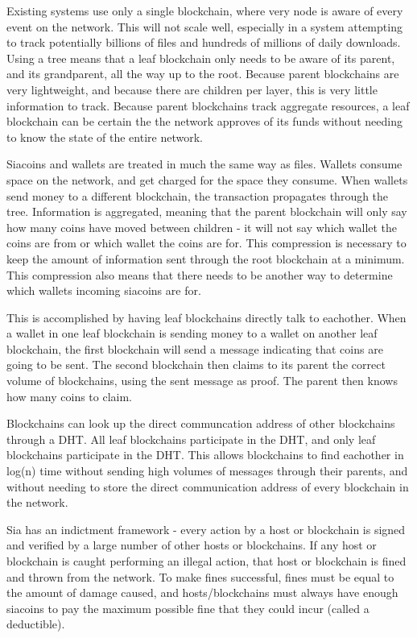 \documentclass[twocolumn]{article}
\begin{document}
Existing systems use only a single blockchain, where very node is aware of every event on the network.
This will not scale well, especially in a system attempting to track potentially billions of files and hundreds of millions of daily downloads.
Using a tree means that a leaf blockchain only needs to be aware of its parent, and its grandparent, all the way up to the root.
Because parent blockchains are very lightweight, and because there are \childrenperparent \space children per layer, this is very little information to track.
Because parent blockchains track aggregate resources, a leaf blockchain can be certain the the network approves of its funds without needing to know the state of the entire network.

Siacoins and wallets are treated in much the same way as files.
Wallets consume space on the network, and get charged for the space they consume.
When wallets send money to a different blockchain, the transaction propagates through the tree.
Information is aggregated, meaning that the parent blockchain will only say how many coins have moved between children - it will not say which wallet the coins are from or which wallet the coins are for.
This compression is necessary to keep the amount of information sent through the root blockchain at a minimum.
This compression also means that there needs to be another way to determine which wallets incoming siacoins are for.

This is accomplished by having leaf blockchains directly talk to eachother.
When a wallet in one leaf blockchain is sending money to a wallet on another leaf blockchain, the first blockchain will send a message indicating that coins are going to be sent.
The second blockchain then claims to its parent the correct volume of blockchains, using the sent message as proof.
The parent then knows how many coins to claim.

Blockchains can look up the direct communcation address of other blockchains through a DHT.
All leaf blockchains participate in the DHT, and only leaf blockchains participate in the DHT.
This allows blockchains to find eachother in log(n) time without sending high volumes of messages through their parents, and without needing to store the direct communication address of every blockchain in the network.

Sia has an indictment framework - every action by a host or blockchain is signed and verified by a large number of other hosts or blockchains.
If any host or blockchain is caught performing an illegal action, that host or blockchain is fined and thrown from the network.
To make fines successful, fines must be equal to the amount of damage caused, and hosts/blockchains must always have enough siacoins to pay the maximum possible fine that they could incur (called a deductible).
\end{document}
